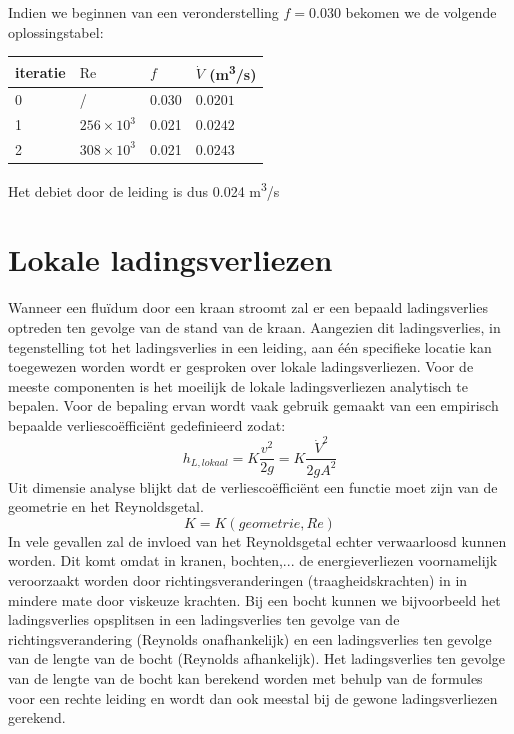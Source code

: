 \begin{voorbeeld}
Indien we beginnen van een veronderstelling $f=0.030$ bekomen we de volgende oplossingstabel:
\begin{center}
	\begin{tabular}{llll}
		\hline
		iteratie & $\mathrm{Re}$   & $f$   & $\dot{V}$ (\unit{m^3/s}) \\
		\hline
		0        &       /         & 0.030 &  $0.0201$ \\
		1        & $256\times10^3$ & 0.021 &  $0.0242$ \\
		2        & $308\times10^3$ & 0.021 &  $0.0243$ \\
		\hline
	\end{tabular}
\end{center}

Het debiet door de leiding is dus 0.024 \unit{m^3/s}

\end{voorbeeld}


	\section{Lokale ladingsverliezen}
	\label{sec:Lokale ladingsverliezen}
Wanneer een fluïdum door een kraan stroomt zal er een bepaald ladingsverlies optreden ten gevolge van de stand van de kraan. Aangezien dit ladingsverlies, in tegenstelling tot het ladingsverlies in een leiding, aan één specifieke locatie kan toegewezen worden wordt er gesproken over lokale ladingsverliezen. Voor de meeste componenten is het moeilijk de lokale ladingsverliezen analytisch te bepalen. Voor de bepaling ervan wordt vaak gebruik gemaakt van een empirisch bepaalde verliescoëfficiënt gedefinieerd zodat:
\begin{equation}
	h_{L, lokaal} = K \frac{v^2}{2 g} = K \frac{\dot{V}^2}{2 g A^2}
	\label{eqn:lokale ladingsverliezen}
\end{equation}
Uit dimensie analyse blijkt dat de verliescoëfficiënt een functie moet zijn van de geometrie en het Reynoldsgetal.
\begin{equation}
	K = K(geometrie, Re)
\end{equation}
In vele gevallen zal de invloed van het Reynoldsgetal echter verwaarloosd kunnen worden. Dit komt omdat in kranen, bochten,... de energieverliezen voornamelijk veroorzaakt worden door richtingsveranderingen (traagheidskrachten) in in mindere mate door viskeuze krachten. Bij een bocht kunnen we bijvoorbeeld het ladingsverlies opsplitsen in een ladingsverlies ten gevolge van de richtingsverandering (Reynolds onafhankelijk) en een ladingsverlies ten gevolge van de lengte van de bocht (Reynolds afhankelijk). Het ladingsverlies ten gevolge van de lengte van de bocht kan berekend worden met behulp van de formules voor een rechte leiding en wordt dan ook meestal bij de gewone ladingsverliezen gerekend.


